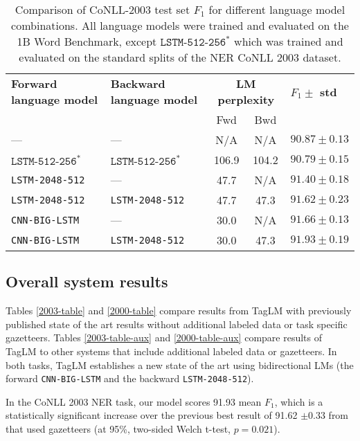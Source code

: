 \documentclass[11pt,a4paper]{article}
\begin{document}
\begin{table*}[t]
\begin{center}
\begin{tabular}{l|l||c|c||l}
\hline \hline
\bf Forward language model &\bf Backward language model & \multicolumn{2}{c||}{\bf LM perplexity} & \bf $F_1 \pm$ std \\
&& Fwd & Bwd & \\ \hline
--- & --- & N/A & N/A & $90.87 \pm 0.13$ \\ \hline
$\texttt{LSTM-512-256}^*$ & $\texttt{LSTM-512-256}^*$ & 106.9 & 104.2 & $90.79 \pm 0.15$ \\ \hline
\texttt{LSTM-2048-512} & --- & 47.7 & N/A & $91.40 \pm 0.18$ \\
\texttt{LSTM-2048-512} & \texttt{LSTM-2048-512} & 47.7 & 47.3 & $91.62 \pm 0.23$ \\ \hline
\texttt{CNN-BIG-LSTM} & --- & 30.0 & N/A & $91.66 \pm 0.13$ \\
\texttt{CNN-BIG-LSTM} & \texttt{LSTM-2048-512} & 30.0 & 47.3 & $\mathbf{91.93 \pm 0.19}$ \\
\hline \hline
\end{tabular}
\end{center}
\caption{\label{2003-table-lm-size} Comparison of CoNLL-2003 test set $F_1$ for different language model combinations.  All language models were trained and evaluated on the 1B Word Benchmark, except $\texttt{LSTM-512-256}^*$ which was trained and evaluated on the standard splits of the NER CoNLL 2003 dataset.}
\end{table*}





\subsection{Overall system results}
\label{sec:overall_system_results}

Tables \ref{2003-table} and \ref{2000-table} compare results from TagLM with
previously published state of the art results without additional labeled data or task specific gazetteers.  Tables \ref{2003-table-aux} and \ref{2000-table-aux} compare results of TagLM to other systems that include additional labeled data or gazetteers.
In both tasks, TagLM establishes a new state of the art using bidirectional LMs (the forward \texttt{CNN-BIG-LSTM} and the backward \texttt{LSTM-2048-512}).

In the CoNLL 2003 NER task, our model scores 91.93
mean $F_1$, which is a statistically significant increase over the previous best result of 91.62 $\pm 0.33$ from \citet{chiu-nichols-2016} that used gazetteers (at 95\%, two-sided Welch t-test, $p=0.021$).  
\end{document}
